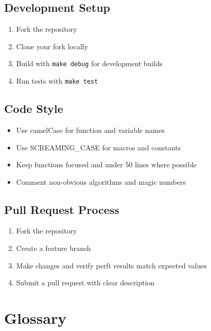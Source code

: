 \documentclass[11pt,a4paper]{report}
\begin{document}
\section{Development Setup}

\begin{enumerate}
    \item Fork the repository
    \item Clone your fork locally
    \item Build with \texttt{make debug} for development builds
    \item Run tests with \texttt{make test}
\end{enumerate}

\section{Code Style}

\begin{itemize}
    \item Use camelCase for function and variable names
    \item Use SCREAMING\_CASE for macros and constants
    \item Keep functions focused and under 50 lines where possible
    \item Comment non-obvious algorithms and magic numbers
\end{itemize}

\section{Pull Request Process}

\begin{enumerate}
    \item Fork the repository
    \item Create a feature branch
    \item Make changes and verify perft results match expected values
    \item Submit a pull request with clear description
\end{enumerate}

\appendix
\chapter{Glossary}
\end{document}
